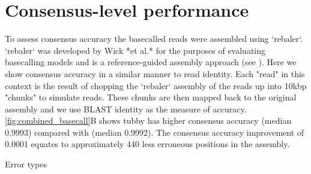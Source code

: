 
\section{Consensus-level performance}

To assess consensus accuracy the basecalled reads were assembled using `rebaler`. `rebaler` was developed by Wick *et al.* for the purposes of evaluating basecalling models and is a reference-guided assembly approach (see ). Here we show consensus accuracy in a similar manner to read identity. Each "read" in this context is the result of chopping the `rebaler` assembly of the reads up into 10kbp "chunks" to simulate reads. These chunks are then mapped back to the original assembly and we use BLAST identity as the measure of accuracy. \autoref{fig:combined_basecall}B shows tubby has higher consensus accuracy (median 0.9993) compared with \guppy{} (median 0.9992). The consensus accuracy improvement of 0.0001 equates to approximately 440 less erroneous positions in the \mtb{} assembly.

Error types

